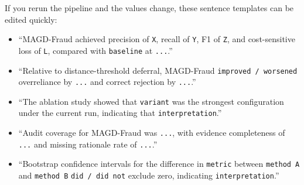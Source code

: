 If you rerun the pipeline and the values change, these sentence templates can be edited quickly:

\begin{itemize}
\item ``MAGD-Fraud achieved precision of \texttt{X}, recall of \texttt{Y}, F1 of \texttt{Z}, and cost-sensitive loss of \texttt{L}, compared with \texttt{baseline} at \texttt{...}.'' 
\item ``Relative to distance-threshold deferral, MAGD-Fraud \texttt{improved / worsened} overreliance by \texttt{...} and correct rejection by \texttt{...}.'' 
\item ``The ablation study showed that \texttt{variant} was the strongest configuration under the current run, indicating that \texttt{interpretation}.'' 
\item ``Audit coverage for MAGD-Fraud was \texttt{...}, with evidence completeness of \texttt{...} and missing rationale rate of \texttt{...}.'' 
\item ``Bootstrap confidence intervals for the difference in \texttt{metric} between \texttt{method A} and \texttt{method B} \texttt{did / did not} exclude zero, indicating \texttt{interpretation}.'' 
\end{itemize}
